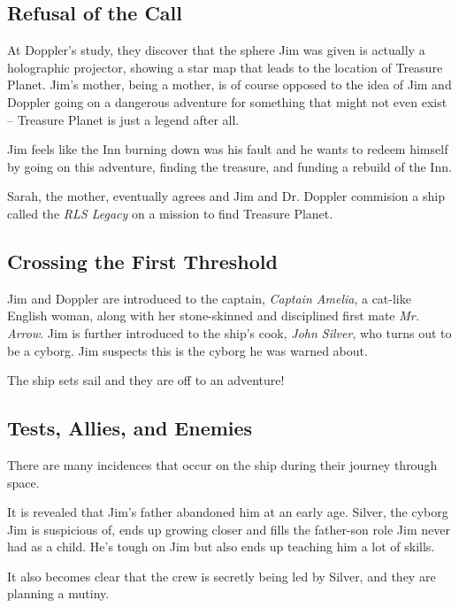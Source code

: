 \documentclass[notitlepage]{fhnwreport}
\begin{document}
\begin{multicols}{2}
\subsection*{Refusal of the Call}

At Doppler's study,  they discover that the sphere Jim was given is actually a
holographic  projector,  showing  a star map that leads  to  the  location  of
Treasure Planet. Jim's  mother,  being  a  mother, is of course opposed to the
idea of Jim and Doppler  going  on  a  dangerous  adventure for something that
might  not  even  exist  --  Treasure  Planet  is  just  a  legend after  all.

Jim  feels  like the Inn burning down was his fault and  he  wants  to  redeem
himself  by  going  on  this  adventure, finding the treasure, and  funding  a
rebuild of the Inn.

Sarah,  the mother, eventually agrees and Jim and Dr. Doppler commision a ship
called  the  \textit{RLS  Legacy}  on  a  mission  to  find  Treasure  Planet.

\subsection*{Crossing the First Threshold}

Jim  and  Doppler  are  introduced  to the captain, \textit{Captain Amelia}, a
cat-like  English  woman,  along  with her stone-skinned and disciplined first
mate \textit{Mr. Arrow}.  Jim  is  further  introduced  to  the  ship's  cook,
\textit{John Silver}, who turns out to be a cyborg. Jim  suspects  this is the
cyborg he was warned about.

The ship sets sail and they are off to an adventure!

\subsection*{Tests, Allies, and Enemies}

There are many incidences  that occur on the ship during their journey through
space.

It is revealed that Jim's father abandoned him at  an  early  age. Silver, the
cyborg Jim is  suspicious  of, ends up growing closer and fills the father-son
role Jim never had as a child. He's tough on Jim but also ends up teaching him
a lot of skills.

It also becomes clear that the crew is  secretly being led by Silver, and they
are planning a mutiny.


\end{multicols}
\end{document}
